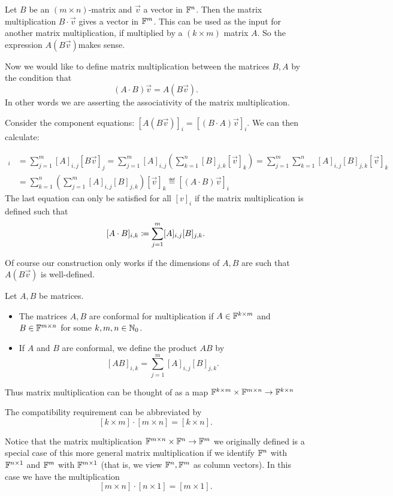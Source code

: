 Let $B$ be an $(m\times n)$-matrix and $\vec{v}$ a vector in $\mathbb{F}^n$. Then the matrix multiplication $B\cdot \vec{v}$ gives a vector in $\mathbb{F}^m$. This can be used as the input for another matrix multiplication, if multiplied by a $(k\times m)$ matrix $A$. So the expression $A(B\vec{v})$makes sense.

Now we would like to define matrix multiplication between the matrices $B,A$ by the condition that
\[ (A\cdot B)\vec{v} = A(B\vec{v}). \]
In other words we are asserting the associativity of the matrix multiplication.

Consider the component equations: $[A(B\vec{v})]_i = [(B\cdot A)\vec{v}]_i$. We can then calculate:

\begin{align*}
[A(B\vec{v})]_i &= \sum_{j=1}^m [A]_{i,j}[B\vec{v}]_j = \sum_{j=1}^m [A]_{i,j}(\sum_{k=1}^n [B]_{j,k}[\vec{v}]_k) = \sum_{j=1}^m\sum_{k=1}^n [A]_{i,j}[B]_{j,k}[\vec{v}]_k \\ &= \sum_{k=1}^n\left(\sum_{j=1}^m[A]_{i,j}[B]_{j,k}\right)[\vec{v}]_k \eqdef  [(A\cdot B)\vec{v}]_i
\end{align*}
The last equation can only be satisfied for all $[v]_i$ if the matrix multiplication is defined such that
\[ [A\cdot B]_{i,k} \coloneqq \sum_{j=1}^m[A]_{i,j}[B]_{j,k}. \]

Of course our construction only works if the dimensions of $A,B$ are such that $A(B\vec{v})$ is well-defined.

\begin{definition}
Let $A,B$ be matrices.
\begin{itemize}
\item The matrices $A,B$ are conformal for multiplication if $A\in \mathbb{F}^{k\times m}$ and $B\in\mathbb{F}^{m\times n}$ for some $k,m,n\in\mathbb{N}_0$.
\item If $A$ and $B$ are conformal, we define the product $AB$ by
\[ [AB]_{i,k} = \sum_{j=1}^m[A]_{i,j}[B]_{j,k}. \]
\end{itemize}
Thus matrix multiplication can be thought of as a map $\mathbb{F}^{k\times m}\times \mathbb{F}^{m\times n} \to \mathbb{F}^{k\times n}$
\end{definition}
The compatibility requirement can be abbreviated by
\[ [k\times m] \cdot [m\times n] = [k\times n]. \]

Notice that the matrix multiplication $\mathbb{F}^{m\times n}\times \mathbb{F}^n \to \mathbb{F}^m$ we originally defined is a special case of this more general matrix multiplication if we identify $\mathbb{F}^n$ with $\mathbb{F}^{n\times 1}$ and $\mathbb{F}^m$ with $\mathbb{F}^{m\times 1}$ (that is, we view $\mathbb{F}^n,\mathbb{F}^m$ as column vectors). In this case we have the multiplication
\[ [m\times n] \cdot [n\times 1] = [m\times 1]. \]

